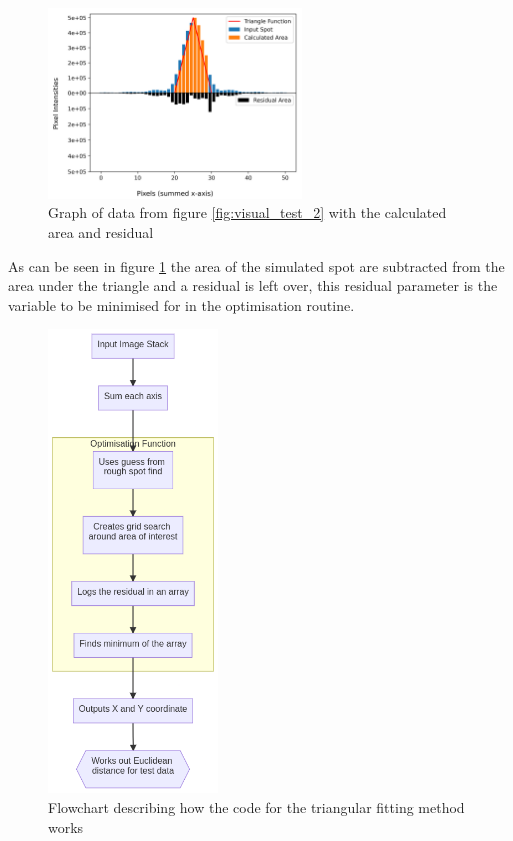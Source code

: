 \documentclass[aps,pra,a4paper,nofootinbib,onecolumn,tightenlines,longbibliography,12pt,amsfonts,amssymb,amsmath,floatfix]{revtex4-2} %
\begin{document}
    \begin{figure}[H]
      \begin{center}
        \includegraphics[width=0.6\textwidth]{project_pics/visual_test.png}
      \end{center}
      \caption{Graph of data from figure \ref{fig:visual_test_2} with the calculated area and residual}
      \label{fig:visual_test}
    \end{figure}
    
    As can be seen in figure \ref{fig:visual_test} the area of the simulated spot are subtracted from 
    the area under the triangle and a residual is left over, this residual parameter is the 
    variable to be minimised for in the optimisation routine.

    \begin{figure}[H]
      \begin{center}
        \includegraphics[width=0.4\textwidth]{project_pics/flowchart.png}
      \end{center}
      \caption{Flowchart describing how the code for the triangular fitting method works}
      \label{fig:flowchart}
    \end{figure}
    
\end{document}
